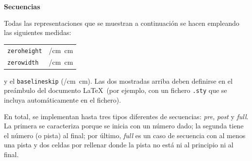 \documentclass[svgnames,addpoints]{exam}
\makeatletter
\newlength{\zerowidth}
\newlength{\zeroheight}
\def\convertto#1#2{\strip@pt\dimexpr #2*65536/\number\dimexpr 1#1}
\makeatother
\begin{document}
\noindent
{\Large\bf Secuencias}

Todas las representaciones que se muestran a continuación se hacen
empleando las siguientes medidas:

\begin{center}
  \begin{tabular}{ll}
    \texttt{zeroheight}   & \convertto{cm}{\the\zeroheight}\ cm \\
    \texttt{zerowidth}    & \convertto{cm}{\the\zerowidth}\ cm \\
  \end{tabular}
\end{center}

\noindent
y el \texttt{baselineskip} (\convertto{cm}{\the\baselineskip}\
cm). Las dos mostradas arriba deben definirse en el preámbulo del
documento \LaTeX\ (por ejemplo, con un fichero \texttt{.sty} que se
incluya automáticamente en el fichero).

En total, se implementan hasta tres tipos diferentes de secuencias:
\textit{pre}, \textit{post} y \textit{full}. La primera se caracteriza porque se
inicia con un número dado; la segunda tiene el número (o pista) al final; por
último, \textit{full} es un caso de secuencia con al menos una pista y dos
celdas por rellenar donde la pista no está ni al principio ni al final.
\end{document}
